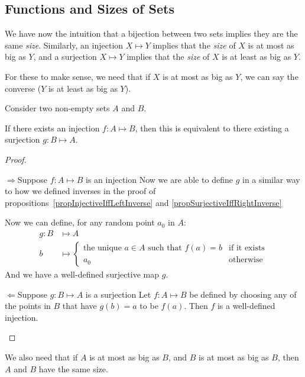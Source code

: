 \documentclass[../Main.tex]{subfiles}
\begin{document}
\subsection{Functions and Sizes of Sets}
We have now the intuition that a bijection between two sets implies they are the same \textit{size}. Similarly, an injection $X \mapsto Y$ implies that the \textit{size} of $X$ is at most as big as $Y$, and a surjection $X \mapsto Y$ implies that the \textit{size} of $X$ is at least as big as $Y$.\par
For these to make sense, we need that if $X$ is at most as big as $Y$, we can say the converse ($Y$ is at least as big as $Y$).
\begin{lemma}
    Consider two non-empty sets $A$ and $B$.\par
    If there exists an injection $f : A \mapsto B$, then this is equivalent to there existing a surjection $g : B \mapsto A$.
\end{lemma}
\begin{proof}
    \begin{proofdirection}{$\Rightarrow$}{Suppose $f : A \mapsto B$ is an injection}
        Now we are able to define $g$ in a similar way to how we defined inverses in the proof of propositions~\ref{propInjectiveIffLeftInverse} and \ref{propSurjectiveIffRightInverse}\par
        Now we can define, for any random point $a_0$ in $A$:
        \begin{align*}
            g : B &\mapsto A \\
            b &\mapsto \begin{cases}
                \text{the unique } a \in A \text{ such that } f(a) = b & \text{if it exists} \\
                a_0 & \text{otherwise}
            \end{cases}
        \end{align*}
        And we have a well-defined surjective map $g$.
    \end{proofdirection}
    \begin{proofdirection}{$\Leftarrow$}{Suppose $g : B \mapsto A$ is a surjection}
        Let $f : A \mapsto B$ be defined by choosing any of the points in $B$ that have $g(b) = a$ to be $f(a)$. Then $f$ is a well-defined injection.
    \end{proofdirection}
\end{proof}
We also need that if $A$ is at most as big as $B$, and $B$ is at most as big as $B$, then $A$ and $B$ have the same size.
\end{document}
